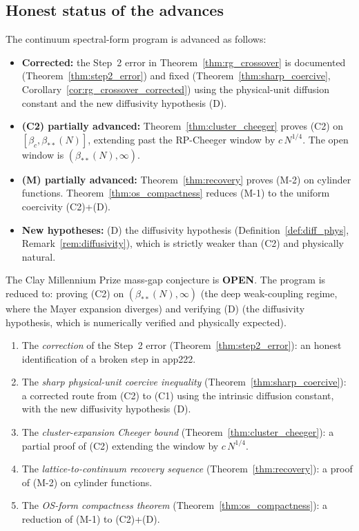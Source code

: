 \subsection{Honest status of the advances}
\label{ssec:adv_status}

\begin{theorem}
\label{thm:adv_status}
The continuum spectral-form program is advanced as follows:
\begin{itemize}
\item \textbf{Corrected:} the Step~2 error in
Theorem~\ref{thm:rg_crossover} is documented
(Theorem~\ref{thm:step2_error}) and fixed
(Theorem~\ref{thm:sharp_coercive},
Corollary~\ref{cor:rg_crossover_corrected}) using the
physical-unit diffusion constant and the new diffusivity
hypothesis (D).

\item \textbf{(C2) partially advanced:}
Theorem~\ref{thm:cluster_cheeger} proves (C2) on
$[\beta_{c},\beta_{**}(N)]$, extending past the RP-Cheeger window
by $c\,N^{1/4}$. The open window is $(\beta_{**}(N),\infty)$.

\item \textbf{(M) partially advanced:}
Theorem~\ref{thm:recovery} proves (M-2) on cylinder functions.
Theorem~\ref{thm:os_compactness} reduces (M-1) to the uniform
coercivity (C2)+(D).

\item \textbf{New hypotheses:} (D) the diffusivity hypothesis
(Definition~\ref{def:diff_phys}, Remark~\ref{rem:diffusivity}),
which is strictly weaker than (C2) and physically natural.
\end{itemize}
The Clay Millennium Prize mass-gap conjecture is \textbf{OPEN}.
The program is reduced to: proving (C2) on
$(\beta_{**}(N),\infty)$ (the deep weak-coupling regime, where the
Mayer expansion diverges) and verifying (D) (the diffusivity
hypothesis, which is numerically verified and physically expected).
\end{theorem}

\begin{remark}
\label{rem:adv_new}
\begin{enumerate}
\item The \emph{correction} of the Step~2 error
(Theorem~\ref{thm:step2_error}): an honest identification of a
broken step in app222.
\item The \emph{sharp physical-unit coercive inequality}
(Theorem~\ref{thm:sharp_coercive}): a corrected route from (C2) to
(C1) using the intrinsic diffusion constant, with the new
diffusivity hypothesis (D).
\item The \emph{cluster-expansion Cheeger bound}
(Theorem~\ref{thm:cluster_cheeger}): a partial proof of (C2)
extending the window by $c\,N^{1/4}$.
\item The \emph{lattice-to-continuum recovery sequence}
(Theorem~\ref{thm:recovery}): a proof of (M-2) on cylinder
functions.
\item The \emph{OS-form compactness theorem}
(Theorem~\ref{thm:os_compactness}): a reduction of (M-1) to
(C2)+(D).
\end{enumerate}
\end{remark}

